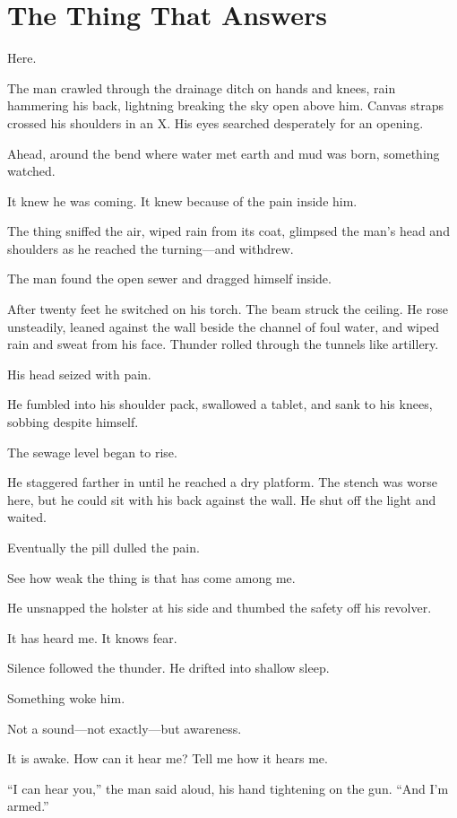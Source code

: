 \chapter{The Thing That Answers}

Here.

The man crawled through the drainage ditch on hands and knees, rain hammering his back, lightning breaking the sky open above him. Canvas straps crossed his shoulders in an X. His eyes searched desperately for an opening.

Ahead, around the bend where water met earth and mud was born, something watched.

It knew he was coming. It knew because of the pain inside him.

The thing sniffed the air, wiped rain from its coat, glimpsed the man’s head and shoulders as he reached the turning—and withdrew.

The man found the open sewer and dragged himself inside.

After twenty feet he switched on his torch. The beam struck the ceiling. He rose unsteadily, leaned against the wall beside the channel of foul water, and wiped rain and sweat from his face. Thunder rolled through the tunnels like artillery.

His head seized with pain.

He fumbled into his shoulder pack, swallowed a tablet, and sank to his knees, sobbing despite himself.

The sewage level began to rise.

He staggered farther in until he reached a dry platform. The stench was worse here, but he could sit with his back against the wall. He shut off the light and waited.

Eventually the pill dulled the pain.

See how weak the thing is that has come among me.

He unsnapped the holster at his side and thumbed the safety off his revolver.

It has heard me. It knows fear.

Silence followed the thunder. He drifted into shallow sleep.

Something woke him.

Not a sound—not exactly—but awareness.

It is awake.
How can it hear me?
Tell me how it hears me.

“I can hear you,” the man said aloud, his hand tightening on the gun. “And I’m armed.”

